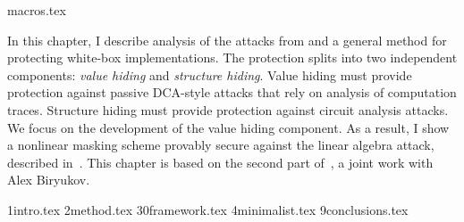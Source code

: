 \myminitoc
{
{macros.tex}

In this chapter, I describe analysis of the attacks from  and a general method for protecting white-box implementations. The protection splits into two independent components: \emph{value hiding} and \emph{structure hiding}. Value hiding must provide protection against passive DCA-style attacks that rely on analysis of computation traces. Structure hiding must provide protection against circuit analysis attacks. We focus on the development of the value hiding component. As a result, I show a nonlinear masking scheme provably secure against the linear algebra attack, described in~. This chapter is based on the second part of~\cite{OurWhitebox}, a joint work with Alex Biryukov.

{1intro.tex}
{2method.tex}
{30framework.tex}
{4minimalist.tex}
{9conclusions.tex}
}